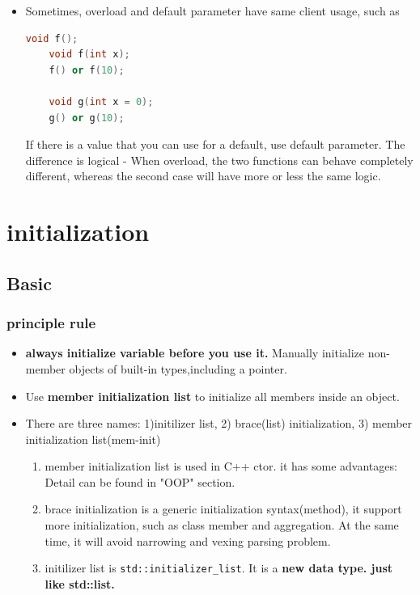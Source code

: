 \documentclass[a4paper,11pt,twoside]{book}
\begin{document}
\begin{itemize}
	
	\item Sometimes, overload and default parameter have same client usage, such as
	\begin{lstlisting}[frame=single, language=c++]
	void f();
	void f(int x);
	f() or f(10);
	
	void g(int x = 0);
	g() or g(10);
	\end{lstlisting}
	
	If there is a value that you can use for a default, use default parameter. The difference is logical - When overload, the two functions can behave completely different, whereas the second case will have more or less the same logic.
	
\end{itemize}



\chapter{initialization}
\section{Basic}

\subsection{principle rule}
\begin{itemize}
	\item \textbf{always initialize variable before you use it.} Manually initialize non-member objects of built-in types,including a pointer.
	
	\item Use \textbf{member initialization list} to initialize all members inside an object.
	
	\item There are three names: 1)initilizer list, 2) brace(list) initialization, 3) member initialization list(mem-init)
	\begin{enumerate}
		\item member initialization list is used in C++ ctor. it has some advantages: Detail can be found in "OOP" section. 
		
		\item brace initialization is a generic initialization syntax(method), it support more initialization, such as class member and aggregation. At the same time, it will avoid narrowing and vexing parsing problem. 
		
		\item initilizer list is \texttt{std::initializer\_list}. It is a \textbf{new data type. just like std::list.}
	\end{enumerate}
\end{itemize}
\end{document}
